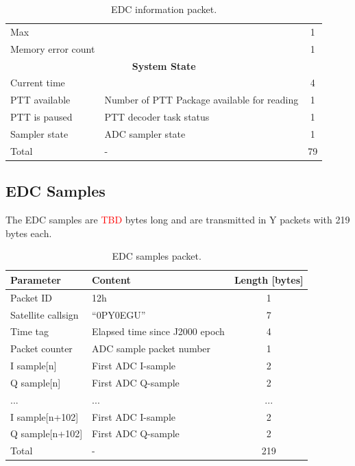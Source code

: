 \begin{table}[!ht]
\begin{tabular}{llc}
        Max                &                                                  & 1 \\
        Memory error count &                                                  & 1 \\
        \midrule
        \multicolumn{3}{c}{\textbf{System State}} \\
        \midrule
        Current time       &                                                  & 4 \\
        PTT available      & Number of PTT Package available for reading      & 1 \\
        PTT is paused      & PTT decoder task status                          & 1 \\
        Sampler state      & ADC sampler state                                & 1 \\
        \midrule
        Total              & -                                                & 79 \\
        \bottomrule[1.5pt]
    \end{tabular}
    \caption{EDC information packet.}
    \label{tab:telemetry-edc}
\end{table}

\subsection{EDC Samples}

The EDC samples are \textcolor{red}{TBD} bytes long and are transmitted in Y packets with 219 bytes each.

\begin{table}[!ht]
    \centering
    \begin{tabular}{llc}
        \toprule[1.5pt]
        \textbf{Parameter} & \textbf{Content}               & \textbf{Length [bytes]} \\
        \midrule
        Packet ID          & 12h                            & 1 \\
        Satellite callsign & ``0PY0EGU''                    & 7 \\
        Time tag           & Elapsed time since J2000 epoch & 4 \\
        Packet counter     & ADC sample packet number       & 1 \\
        I sample[n]        & First ADC I-sample             & 2 \\
        Q sample[n]        & First ADC Q-sample             & 2 \\
        ...                & ...                            & ... \\
        I sample[n+102]    & First ADC I-sample             & 2 \\
        Q sample[n+102]    & First ADC Q-sample             & 2 \\
        \midrule
        Total              & -                              & 219 \\
        \bottomrule[1.5pt]
    \end{tabular}
    \caption{EDC samples packet.}
    \label{tab:telemetry-edc-samples}
\end{table}

